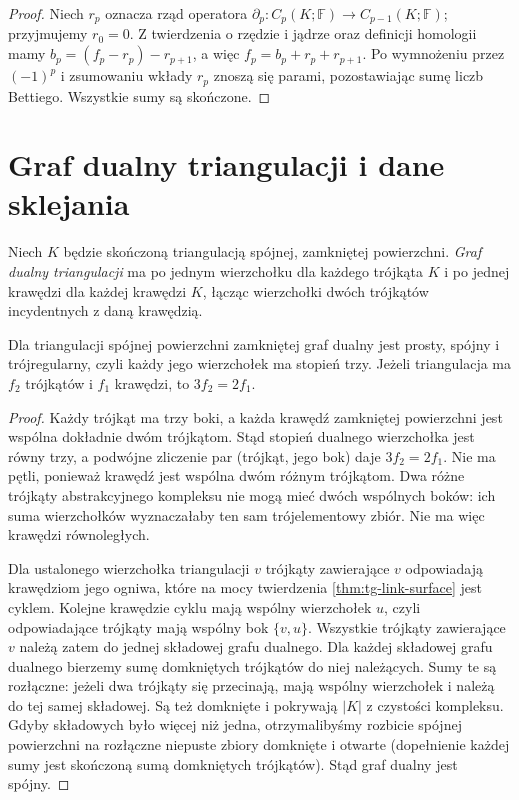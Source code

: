 \begin{proof}
Niech $r_p$ oznacza rząd operatora
$\partial_p:C_p(K;\mathbb F)\to C_{p-1}(K;\mathbb F)$;
przyjmujemy $r_0=0$. Z twierdzenia o rzędzie i jądrze
oraz definicji homologii mamy
$b_p=(f_p-r_p)-r_{p+1}$, a więc
$f_p=b_p+r_p+r_{p+1}$. Po wymnożeniu przez $(-1)^p$
i zsumowaniu wkłady $r_p$ znoszą się parami, pozostawiając
sumę liczb Bettiego. Wszystkie sumy są skończone.
\end{proof}

\section{Graf dualny triangulacji i dane sklejania}
\label{sec:tg-dual-triangulation}

\begin{definicja}
Niech $K$ będzie skończoną triangulacją spójnej,
zamkniętej powierzchni. \emph{Graf dualny triangulacji}
ma po jednym wierzchołku dla każdego trójkąta $K$
i po jednej krawędzi dla każdej krawędzi $K$, łącząc
wierzchołki dwóch trójkątów incydentnych z daną krawędzią.
\end{definicja}

\begin{stwierdzenie}
Dla triangulacji spójnej powierzchni zamkniętej graf dualny jest
prosty, spójny i trójregularny, czyli każdy jego wierzchołek ma
stopień trzy. Jeżeli triangulacja ma
$f_2$ trójkątów i $f_1$ krawędzi, to
$3f_2=2f_1$.
\end{stwierdzenie}

\begin{proof}
Każdy trójkąt ma trzy boki, a każda krawędź zamkniętej
powierzchni jest wspólna dokładnie dwóm trójkątom.
Stąd stopień dualnego wierzchołka jest równy trzy,
a podwójne zliczenie par (trójkąt, jego bok) daje
$3f_2=2f_1$. Nie ma pętli, ponieważ krawędź jest
wspólna dwóm różnym trójkątom. Dwa różne trójkąty
abstrakcyjnego kompleksu nie mogą mieć dwóch wspólnych
boków: ich suma wierzchołków wyznaczałaby ten sam
trójelementowy zbiór. Nie ma więc krawędzi równoległych.

Dla ustalonego wierzchołka triangulacji $v$ trójkąty
zawierające $v$ odpowiadają krawędziom jego ogniwa,
które na mocy twierdzenia \ref{thm:tg-link-surface}
jest cyklem. Kolejne krawędzie cyklu mają wspólny
wierzchołek $u$, czyli odpowiadające trójkąty mają
wspólny bok $\{v,u\}$. Wszystkie trójkąty zawierające
$v$ należą zatem do jednej składowej grafu dualnego.
Dla każdej składowej grafu dualnego bierzemy sumę
domkniętych trójkątów do niej należących. Sumy te są
rozłączne: jeżeli dwa trójkąty się przecinają, mają
wspólny wierzchołek i należą do tej samej składowej.
Są też domknięte i pokrywają $|K|$ z czystości kompleksu.
Gdyby składowych było więcej niż jedna, otrzymalibyśmy
rozbicie spójnej powierzchni na rozłączne niepuste
zbiory domknięte i otwarte (dopełnienie każdej sumy
jest skończoną sumą domkniętych trójkątów).
Stąd graf dualny jest spójny.
\end{proof}

